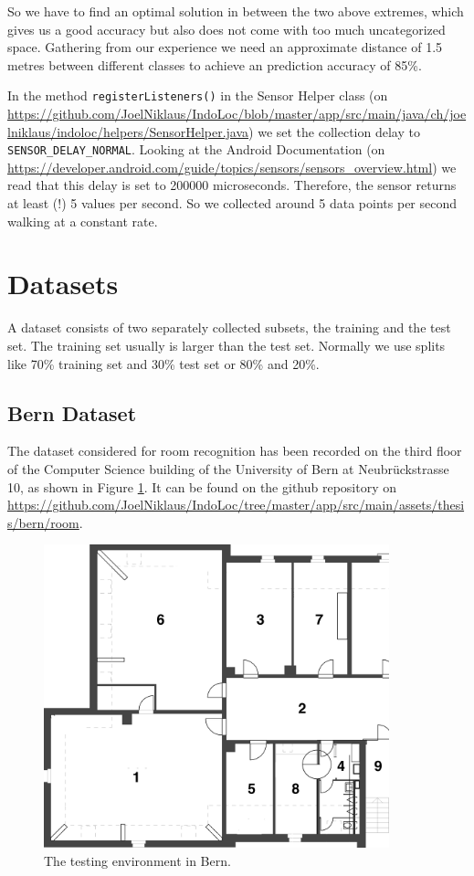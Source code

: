 So we have to find an optimal solution in between the two above extremes, which gives us a good accuracy but also does not come with too much uncategorized space.  Gathering from our experience we need an approximate distance of 1.5 metres between different classes to achieve an prediction accuracy of 85\%. 


In the method \texttt{registerListeners()} in the Sensor Helper class (on \url{https://github.com/JoelNiklaus/IndoLoc/blob/master/app/src/main/java/ch/joelniklaus/indoloc/helpers/SensorHelper.java}) we set the collection delay to \texttt{SENSOR\_DELAY\_NORMAL}. Looking at the Android Documentation (on \url{https://developer.android.com/guide/topics/sensors/sensors_overview.html}) we read that this delay is set to 200000 microseconds. Therefore, the sensor returns at least (!) 5 values per second.
So we collected around 5 data points per second walking at a constant rate.



\section{Datasets}

A dataset consists of two separately collected subsets, the training and the test set. The training set usually is larger than the test set. Normally we use splits like 70\% training set and 30\% test set or 80\% and 20\%.

\subsection{Bern Dataset}
\label{sec:BernDataset}
The dataset considered for room recognition has been recorded on the third floor of the Computer Science building of the University of Bern at Neubrückstrasse 10, as shown in Figure \ref{fig:Bern}. It can be found on the github repository on \url{https://github.com/JoelNiklaus/IndoLoc/tree/master/app/src/main/assets/thesis/bern/room}.

\begin{figure}[H]
\centering
\includegraphics[width=100mm]{Figures/Bern.jpg}
\decoRule
\caption[Bern]{The testing environment in Bern.}
\label{fig:Bern}
\end{figure}

